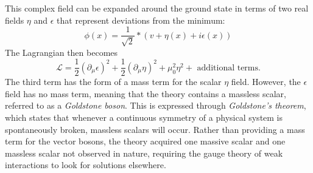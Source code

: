 This complex field can be expanded around the ground state in terms of two real fields $\eta$ and $\epsilon$ that represent deviations from the minimum:
\begin{equation}
\phi(x) = \frac{1}{\sqrt{2}}*(v+\eta(x)+i\epsilon(x))
\end{equation}
 The Lagrangian then becomes
\begin{equation}
\mathcal{L} = \frac{1}{2}(\partial_{\mu}\epsilon)^2 + \frac{1}{2}(\partial_{\mu}\eta)^2+\mu_0^2\eta^2 + \textrm{ additional terms}.
\end{equation}
The third term has the form of a mass term for the scalar $\eta$ field. However, the $\epsilon$ field has no mass term, meaning that the theory contains a massless scalar, referred to as a \emph{Goldstone boson}. This is expressed through \emph{Goldstone's theorem}, which states that whenever a continuous symmetry of a physical system is spontaneously broken, massless scalars will occur. Rather than providing a mass term for the vector bosons, the theory acquired one massive scalar and one massless scalar not observed in nature, requiring the gauge theory of weak interactions to look for solutions elsewhere.

